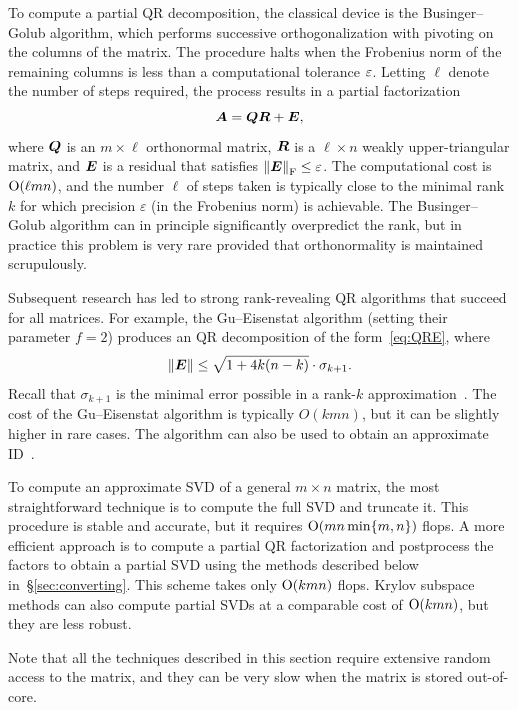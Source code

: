\documentclass[final]{siamltex}
\newcounter{algorithm}[section]
\begin{document}
To compute a partial QR decomposition, the classical device is the
Businger--Golub algorithm, which performs successive orthogonalization
with pivoting on the columns of the matrix. The procedure halts
when the Frobenius norm of the remaining columns is
less than a computational tolerance $\varepsilon$. Letting $\ell$ denote
the number of steps required, the process results in a partial factorization
\begin{equation} \label{eq:QRE}
\mtx{A} = \mtx{QR} + \mtx{E},
\end{equation}
where $\bm{Q}$ is an $m \times \ell$ orthonormal matrix, $\bm{R}$
is a $\ell \times n$ weakly upper-triangular matrix, and $\bm{E}$
is a residual that satisfies $\left\Vert {\bm{E}} \right\Vert_{\mathrm{F}} \leq \varepsilon$.
The computational cost is $\mathrm{O}(\ell mn)$, and the number
$\ell$ of steps taken is typically close to the minimal rank $k$ for
which precision $\varepsilon$ (in the Frobenius norm) is achievable.
The Businger--Golub algorithm can in principle significantly
overpredict the rank, but in practice this problem is very rare
provided that orthonormality is maintained scrupulously.

Subsequent research has led to strong rank-revealing QR algorithms
that succeed for all matrices.  For example, the Gu--Eisenstat algorithm \cite{gu_rrqr}
(setting their parameter $f = 2$)
produces an QR decomposition of the form~\eqref{eq:QRE}, where
$$
\left\Vert {\bm{E}} \right\Vert \leq \sqrt{1 + 4k(n-k)} \cdot \sigma_{k+1}.
$$
Recall that $\sigma_{k+1}$ is the minimal error possible in a rank-$k$
approximation~\cite{Mir60:Symmetric-Gauge}.  The cost of the Gu--Eisenstat
algorithm is typically $O(kmn)$, but it can be slightly higher in rare cases.
The algorithm can also be used to obtain an approximate ID~\cite{mskel}.

To compute an approximate SVD of a general $m \times n$ matrix,
the most straightforward technique is to compute the full SVD and
truncate it.  This procedure is stable and accurate, but it
requires $\mathrm{O}(mn\min\{m,n\})$ flops.  A more efficient approach
is to compute a partial QR factorization and postprocess the
factors to obtain a partial SVD using the methods described below
in~\S\ref{sec:converting}.  This scheme takes only $\mathrm{O}(kmn)$ flops.
Krylov subspace methods can also compute partial SVDs at a comparable
cost of $\mathrm{O}(kmn)$, but they are less robust.

Note that all the techniques described in this section require
extensive random access to the matrix, and they can be very slow when
the matrix is stored out-of-core.
\end{document}
